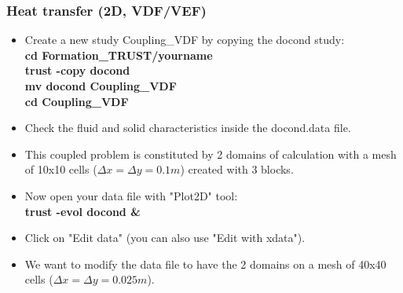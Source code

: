 \documentclass[10pt, hyperref={unicode=true,pdfusetitle, bookmarks=true,bookmarksnumbered=false,bookmarksopen=false, breaklinks=false,pdfborder={0 0 1},backref=true,colorlinks=true,linkcolor=darkblue,pageanchor}]{beamer}
\begin{document}
\begin{frame}
\frametitle{Heat transfer (2D, VDF/VEF)}
\begin{block}{}

\begin{itemize}
\item Create a new study Coupling\_VDF by copying the docond study:\\
\textbf{cd Formation\_TRUST/yourname} \\
\textbf{trust -copy docond} \\
\textbf{mv docond Coupling\_VDF} \\
\textbf{cd Coupling\_VDF} \\

\item Check the fluid and solid characteristics inside the docond.data file.

\item This coupled problem is constituted by 2 domains of calculation with a mesh of 10x10 cells ($\Delta x = \Delta y = 0.1m$) created with 3 blocks. 

\item Now open your data file with "Plot2D" tool:\\
\textbf{trust -evol docond  \&} \\

\item Click on "Edit data" (you can also use "Edit with xdata").

\item We want to modify the data file to have the 2 domains on a mesh of 40x40 cells ($\Delta x= \Delta y=0.025m$). 
\end{itemize}

\end{block}
\end{frame}
\end{document}
